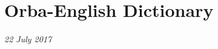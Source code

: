 \documentclass[a4paper]{article}
\begin{document}
\newcommand{\display}[2]{ \BeginAccSupp{method=escape,ActualText=#2}%
\textbf{#1}%
\EndAccSupp{}\textbf{,} }

\newcommand{\head}[1]{#1,}

\newcommand{\partofspeech}[1]{\textit{#1}.}

\newcommand{\definition}[1]{#1}

\newcommand{\letter}[1]{\bigskip\section*{#1}\hangparas{1em}{1}}

\newcommand{\example}[2]{---\textit{#1}, #2}

\newcommand{\bio}[1]{\textit{#1}}

\newcommand{\igboizugbe}[1]{[Igbo: \textit{#1}.]}

\newcommand{\hd}[1]{\d{\'#1}}
\newcommand{\md}[1]{\ifthenelse{\equal{#1}{i}}%
                              {\d{\=\i}}%
                              {\d{\=#1}}}
\newcommand{\ld}[1]{\d{\`#1}}

\newcommand{\h}[1]{\'#1}
\newcommand{\m}[1]{\ifthenelse{\equal{#1}{i}}%
                              {\=\i}%
                              {\=#1}}
\renewcommand{\l}[1]{\`#1}

\newcommand{\reference}[1]{\textbf{#1}}

\newcommand{\+}{\textschwa}

\newcommand{\termslot}{
{\large \textbf{Term} (with pronunciation) \\

{Part of Speech:} \\

{Meaning:} \\

{Example sentence:} \\

{Translation:}} \\
\bigskip
}

\section*{Orba-English Dictionary}
\emph{22 July 2017}
\end{document}
